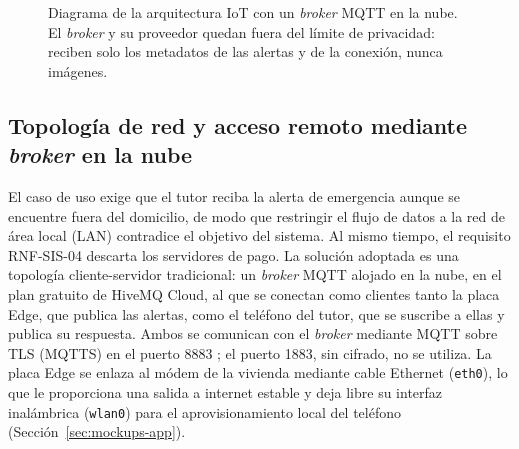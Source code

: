 \documentclass[12pt,a4paper,oneside]{book}
\theoremstyle{plain}
\theoremstyle{definition}
\theoremstyle{remark}
\begin{document}
\begin{figure}[H]
{}
\caption{Diagrama de la arquitectura IoT con un \textit{broker} MQTT en la nube. El \textit{broker} y su proveedor quedan fuera del límite de privacidad: reciben solo los metadatos de las alertas y de la conexión, nunca imágenes.}
\label{fig:arquitectura_iot}
\end{figure}

\subsection{Topología de red y acceso remoto mediante \textit{broker} en la nube}
\label{sec:topologia-red}

El caso de uso exige que el tutor reciba la alerta de emergencia aunque se encuentre fuera del domicilio, de modo que restringir el flujo de datos a la red de área local (LAN) contradice el objetivo del sistema. Al mismo tiempo, el requisito RNF-SIS-04 descarta los servidores de pago. La solución adoptada es una topología cliente-servidor tradicional: un \textit{broker} MQTT alojado en la nube, en el plan gratuito de HiveMQ Cloud, al que se conectan como clientes tanto la placa Edge, que publica las alertas, como el teléfono del tutor, que se suscribe a ellas y publica su respuesta. Ambos se comunican con el \textit{broker} mediante MQTT sobre TLS (MQTTS) en el puerto 8883 \parencite{oasis2014mqtt311}; el puerto 1883, sin cifrado, no se utiliza. La placa Edge se enlaza al módem de la vivienda mediante cable Ethernet (\texttt{eth0}), lo que le proporciona una salida a internet estable y deja libre su interfaz inalámbrica (\texttt{wlan0}) para el aprovisionamiento local del teléfono (Sección~\ref{sec:mockups-app}).
\end{document}
